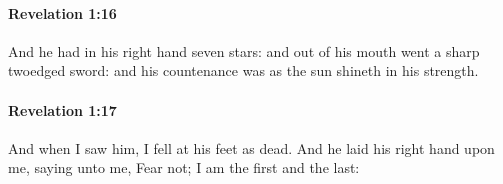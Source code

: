 		\paragraph{Revelation 1:16} %
			\label{REVELATIONNT-1-16}

			And he had in his right hand seven stars: and out of his mouth went a sharp twoedged sword: and his countenance was as the sun shineth in his strength.

			\begin{framed}
			\scriptsize
				\begin{compactdesc}
					\item[SBLG] 
				\end{compactdesc}
			\end{framed}

		\paragraph{Revelation 1:17} %
			\label{REVELATIONNT-1-17}

			And when I saw him, I fell at his feet as dead. And he laid his right hand upon me, saying unto me, Fear not; I am the first and the last:

